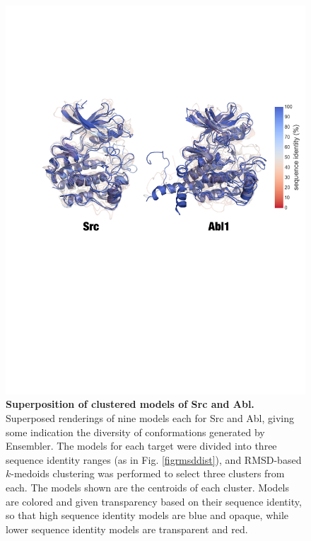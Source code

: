 \documentclass[aps,pre,twocolumn,nofootinbib,superscriptaddress,linenumbers]{revtex4-1}
\begin{document}
\begin{figure}[tb]
  \centering
    \includegraphics[width=1.0\textwidth]{superposition-src_abl/superposed-seqid_classes-clustered-one_fig}
    \caption{{\bf Superposition of clustered models of Src and Abl.}
    Superposed renderings of nine models each for Src and Abl, giving some indication the diversity of conformations generated by Ensembler.
    The models for each target were divided into three sequence identity ranges (as in Fig. \ref{figrmsddist}), and RMSD-based $k$-medoids clustering was performed to select three clusters from each.
    The models shown are the centroids of each cluster.
    Models are colored and given transparency based on their sequence identity, so that high sequence identity models are blue and opaque, while lower sequence identity models are transparent and red.
  }
  \label{figsuperposition}
\end{figure}
\end{document}
